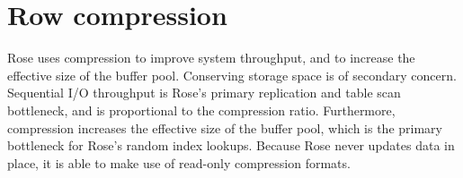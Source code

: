 \documentclass{vldb}
\newcommand{\rows}{Rose\xspace}
\newcommand{\rowss}{Rose's\xspace}
\begin{document}



\section{Row compression}

\rows uses compression to improve system throughput, and to increase
the effective size of the buffer pool.  Conserving storage space is of
secondary concern.  Sequential I/O throughput is \rowss primary
replication and table scan bottleneck, and is proportional to the
compression ratio.  Furthermore, compression increases the effective
size of the buffer pool, which is the primary bottleneck for \rowss
random index lookups.  Because \rows never updates data in place, it
is able to make use of read-only compression formats.

\end{document}
